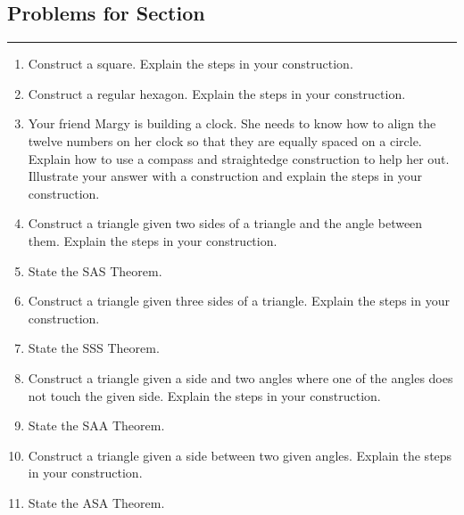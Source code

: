\newpage


\subsection*{Problems for Section~\thesection}\hrule\vspace{1ex}
\begin{enumerate}


\item Construct a square. Explain the steps in your construction.

\item Construct a regular hexagon. Explain the steps in your construction.


\item Your friend Margy is building a clock. She needs to know how to align
the twelve numbers on her clock so that they are equally spaced on a
circle. Explain how to use a compass and straightedge construction to
help her out. Illustrate your answer with a construction and explain
the steps in your construction.

\item Construct a triangle given two sides of a triangle and the angle
  between them. Explain the steps in your construction.

\item State the SAS Theorem.

\item Construct a triangle given three sides of a triangle. Explain
  the steps in your construction.

\item State the SSS Theorem.


\item Construct a triangle given a side and two angles where one of
  the angles does not touch the given side. Explain the steps in your
  construction.

\item State the SAA Theorem.

\item Construct a triangle given a side between two given
  angles. Explain the steps in your construction.

\item State the ASA Theorem.


\end{enumerate}
